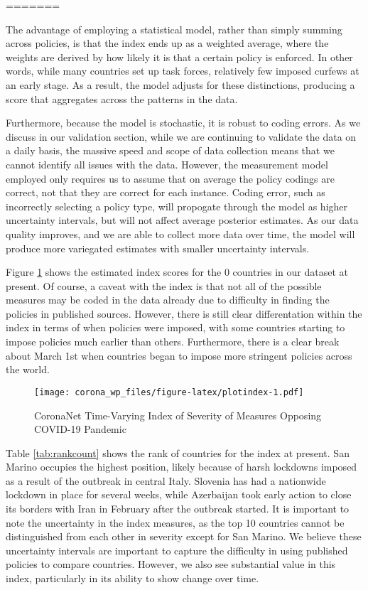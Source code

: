 \documentclass[]{article}
\begin{document}
=======

The advantage of employing a statistical model, rather than simply summing across policies, is that the index ends up as a weighted average, where the weights are derived by how likely it is that a certain policy is enforced. In other words, while many countries set up task forces, relatively few imposed curfews at an early stage. As a result, the model adjusts for these distinctions, producing a score that aggregates across the patterns in the data.

Furthermore, because the model is stochastic, it is robust to coding errors. As we discuss in our validation section, while we are continuing to validate the data on a daily basis, the massive speed and scope of data collection means that we cannot identify all issues with the data. However, the measurement model employed only requires us to assume that on average the policy codings are correct, not that they are correct for each instance. Coding error, such as incorrectly selecting a policy type, will propogate through the model as higher uncertainty intervals, but will not affect average posterior estimates. As our data quality improves, and we are able to collect more data over time, the model will produce more variegated estimates with smaller uncertainty intervals.

Figure \ref{fig:plotindex} shows the estimated index scores for the 0 countries in our dataset at present. Of course, a caveat with the index is that not all of the possible measures may be coded in the data already due to difficulty in finding the policies in published sources. However, there is still clear differentation within the index in terms of when policies were imposed, with some countries starting to impose policies much earlier than others. Furthermore, there is a clear break about March 1st when countries began to impose more stringent policies across the world.

\begin{figure}
\centering
\texttt{[image: corona\_wp\_files/figure-latex/plotindex-1.pdf]}
\caption{\label{fig:plotindex}CoronaNet Time-Varying Index of Severity of Measures Opposing COVID-19 Pandemic}
\end{figure}

Table \ref{tab:rankcount} shows the rank of countries for the index at present. San Marino occupies the highest position, likely because of harsh lockdowns imposed as a result of the outbreak in central Italy. Slovenia has had a nationwide lockdown in place for several weeks, while Azerbaijan took early action to close its borders with Iran in February after the outbreak started. It is important to note the uncertainty in the index measures, as the top 10 countries cannot be distinguished from each other in severity except for San Marino. We believe these uncertainty intervals are important to capture the difficulty in using published policies to compare countries. However, we also see substantial value in this index, particularly in its ability to show change over time.
\end{document}
